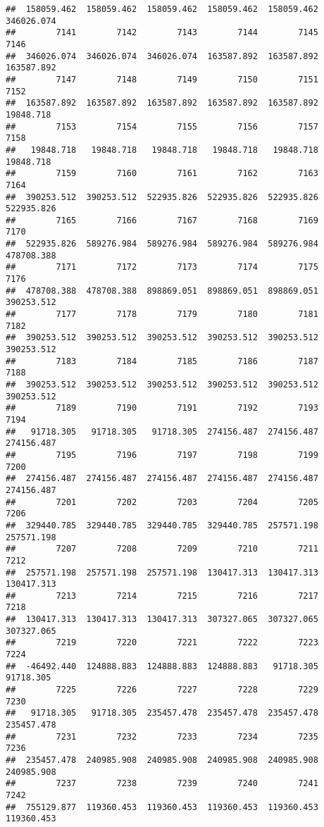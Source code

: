 \documentclass[
]{book}
\begin{document}
\begin{verbatim}
##  158059.462  158059.462  158059.462  158059.462  158059.462  346026.074 
##        7141        7142        7143        7144        7145        7146 
##  346026.074  346026.074  346026.074  163587.892  163587.892  163587.892 
##        7147        7148        7149        7150        7151        7152 
##  163587.892  163587.892  163587.892  163587.892  163587.892   19848.718 
##        7153        7154        7155        7156        7157        7158 
##   19848.718   19848.718   19848.718   19848.718   19848.718   19848.718 
##        7159        7160        7161        7162        7163        7164 
##  390253.512  390253.512  522935.826  522935.826  522935.826  522935.826 
##        7165        7166        7167        7168        7169        7170 
##  522935.826  589276.984  589276.984  589276.984  589276.984  478708.388 
##        7171        7172        7173        7174        7175        7176 
##  478708.388  478708.388  898869.051  898869.051  898869.051  390253.512 
##        7177        7178        7179        7180        7181        7182 
##  390253.512  390253.512  390253.512  390253.512  390253.512  390253.512 
##        7183        7184        7185        7186        7187        7188 
##  390253.512  390253.512  390253.512  390253.512  390253.512  390253.512 
##        7189        7190        7191        7192        7193        7194 
##   91718.305   91718.305   91718.305  274156.487  274156.487  274156.487 
##        7195        7196        7197        7198        7199        7200 
##  274156.487  274156.487  274156.487  274156.487  274156.487  274156.487 
##        7201        7202        7203        7204        7205        7206 
##  329440.785  329440.785  329440.785  329440.785  257571.198  257571.198 
##        7207        7208        7209        7210        7211        7212 
##  257571.198  257571.198  257571.198  130417.313  130417.313  130417.313 
##        7213        7214        7215        7216        7217        7218 
##  130417.313  130417.313  130417.313  307327.065  307327.065  307327.065 
##        7219        7220        7221        7222        7223        7224 
##  -46492.440  124888.883  124888.883  124888.883   91718.305   91718.305 
##        7225        7226        7227        7228        7229        7230 
##   91718.305   91718.305  235457.478  235457.478  235457.478  235457.478 
##        7231        7232        7233        7234        7235        7236 
##  235457.478  240985.908  240985.908  240985.908  240985.908  240985.908 
##        7237        7238        7239        7240        7241        7242 
##  755129.877  119360.453  119360.453  119360.453  119360.453  119360.453 

\end{verbatim}
\end{document}
